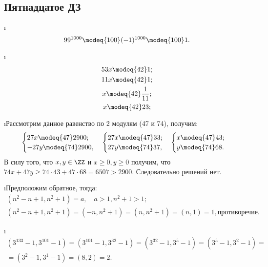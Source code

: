 \subsection{Пятнадцатое ДЗ}

\i
\begin{gather*}
    99^{1000} \modeq{100} (-1)^{1000} \modeq{100} 1.
\end{gather*}

\i
\begin{gather*}
    53x \modeq{42} 1;\\
    11x \modeq{42} 1;\\
    x \modeq{42} \frac{1}{11};\\
    x \modeq{42} 23;
\end{gather*}

\i Рассмотрим данное равенство по 2 модулям (47 и 74), получим:
\begin{gather*}
    \begin{cases}
        27x \modeq{47} 2900;\\
        -27y \modeq{74} 2900,
    \end{cases}
    \begin{cases}
        27x \modeq{47} 33;\\
        27y \modeq{74} 37,
    \end{cases}
    \begin{cases}
        x \modeq{47} 43;\\
        y \modeq{74} 68.
    \end{cases}
\end{gather*}
В силу того, что $x, y \in \ZZ$ и $x \geq 0, y \geq 0$ получим, что $74x + 47y \geq 74\cdot43 + 47\cdot68 = 6507 > 2900$. Следовательно решений нет.

\i Предположим обратное, тогда:
\begin{gather*}
    (n^2-n+1, n^2+1) = a, \quad a > 1, n^2+1 > 1;\\
    (n^2-n+1, n^2+1) = (-n, n^2+1) = (n, n^2+1) = (n, 1) = 1, \text{противоречие.}
\end{gather*}

\i
\begin{gather*}
    (3^{133}-1, 3^{101}-1) = (3^{101}-1, 3^{32}-1) = (3^{32}-1, 3^{5}-1) = (3^{5}-1, 3^{2}-1) = \\ = (3^{2}-1, 3^1-1) = (8, 2) = 2. 
\end{gather*}

